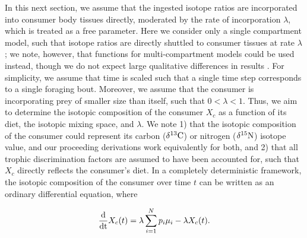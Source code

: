 \documentclass{frontiersSCNS}
\begin{document}
In this next section, we assume that the ingested isotope ratios are incorporated into consumer body tissues directly, moderated by the rate of incorporation $\lambda$, which is treated as a free parameter.
Here we consider only a single compartment model, such that isotope ratios are directly shuttled to consumer tissues at rate $\lambda$; we note, however, that functions for multi-compartment models could be used instead, though we do not expect large qualitative differences in results \citep[cf. Fig. 1 in][]{delRio:2008bs}.
For simplicity, we assume that time is scaled such that a single time step corresponds to a single foraging bout.
Moreover, we assume that the consumer is incorporating prey of smaller size than itself, such that $ 0 < \lambda < 1$.
Thus, we aim to determine the isotopic composition of the consumer $X_c$ as a function of its diet, the isotopic mixing space, and $\lambda$.
We note 1) that the isotopic composition of the consumer could represent its carbon ($\delta^{13}{\rm C}$) or nitrogen ($\delta^{15}{\rm N}$) isotope value, and our proceeding derivations work equivalently for both, and 2) that all trophic discrimination factors are assumed to have been accounted for, such that $X_c$ directly reflects the consumer's diet.
In a completely deterministic framework, the isotopic composition of the consumer over time $t$ can be written as an ordinary differential equation, where

\begin{equation}
\label{eqODE}
\frac{\rm d}{\rm dt} X_c(t) = \lambda \sum_{i=1}^N p_i \mu_i - \lambda X_c(t).
\end{equation}
\end{document}
